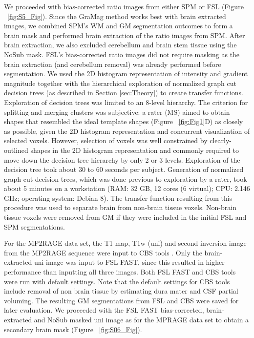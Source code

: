 We proceeded with bias-corrected ratio images from either SPM or FSL (Figure ~\ref{fig:S5_Fig}). Since the GraMag method works best with brain extracted images, we combined SPM's WM and GM segmentation outcomes to form a brain mask and performed brain extraction of the ratio images from SPM. After brain extraction, we also excluded cerebellum and brain stem tissue using the NoSub mask. FSL's bias-corrected ratio images did not require masking as the brain extraction (and cerebellum removal) was already performed before segmentation. We used the 2D histogram representation of intensity and gradient magnitude together with the hierarchical exploration of normalized graph cut decision trees (as described in Section \ref{sec:Theory}) to create transfer functions. Exploration of decision trees was limited to an 8-level hierarchy. The criterion for splitting and merging clusters was subjective: a rater (MS) aimed to obtain shapes that resembled the ideal template shapes (Figure ~\ref{fig:Fig1}D) as closely as possible, given the 2D histogram representation and concurrent visualization of selected voxels. However, selection of voxels was well constrained by clearly-outlined shapes in the 2D histogram representation and commonly required to move down the decision tree hierarchy by only 2 or 3 levels. Exploration of the decision tree took about 30 to 60 seconds per subject. Generation of normalized graph cut decision trees, which was done previous to exploration by a rater, took about 5 minutes on a workstation  (RAM: 32 GB, 12 cores (6 virtual); CPU: 2.146 GHz; operating system: Debian 8). The transfer function resulting from this procedure was used to separate brain from non-brain tissue voxels. Non-brain tissue voxels were removed from GM if they were included in the initial FSL and SPM segmentations.

For the MP2RAGE data set, the T1 map, T1w (uni) and second inversion image from the MP2RAGE sequence were input to CBS tools \parencite{Bazin2014}. Only the brain-extracted \parencite{Smith2002} uni image was input to FSL FAST, since this resulted in higher performance than inputting all three images. Both FSL FAST and CBS tools were run with default settings. Note that the default settings for CBS tools include removal of non brain tissue by estimating dura mater and CSF partial voluming. The resulting GM segmentations from FSL and CBS were saved for later evaluation. We proceeded with the FSL FAST bias-corrected, brain-extracted and NoSub masked uni image as for the MPRAGE data set to obtain a secondary brain mask (Figure ~\ref{fig:S06_Fig}).

